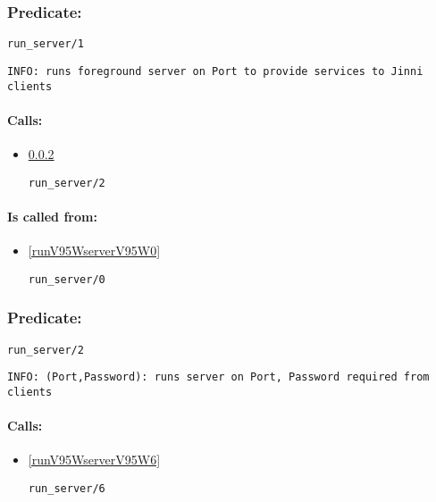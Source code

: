 \subsubsection{Predicate:} \label{runV95WserverV95W1}

\begin{verbatim}
run_server/1
\end{verbatim}

{\small \begin{verbatim}
INFO: runs foreground server on Port to provide services to Jinni clients

\end{verbatim}}
\paragraph{Calls:} 
\begin{itemize}
\item \ref{runV95WserverV95W2} 
\begin{verbatim}
run_server/2
\end{verbatim}

\end{itemize}
\paragraph{Is called from:} 
\begin{itemize}
\item \ref{runV95WserverV95W0} 
\begin{verbatim}
run_server/0
\end{verbatim}

\end{itemize}

\subsubsection{Predicate:} \label{runV95WserverV95W2}

\begin{verbatim}
run_server/2
\end{verbatim}

{\small \begin{verbatim}
INFO: (Port,Password): runs server on Port, Password required from clients

\end{verbatim}}
\paragraph{Calls:} 
\begin{itemize}
\item \ref{runV95WserverV95W6} 
\begin{verbatim}
run_server/6
\end{verbatim}

\end{itemize}
